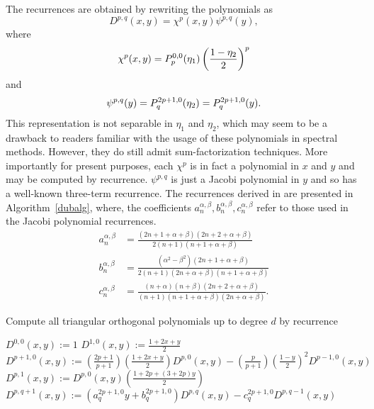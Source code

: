 The recurrences are obtained by rewriting the polynomials as
\[
D^{p,q}(x,y) = \chi^{p}(x,y) \psi^{p,q}(y),
\]
where\vspace*{10pt}
\[
 \chi^{p}(x,y) = P^{0,0}_p(\eta_1) \left( \frac{1-\eta_2}{2}
\right)^p\vspace*{1.5pt}
\]
and\vspace*{10pt}
\[
\psi^{p,q}(y)=P^{2p+1,0}_q(\eta_2) = P^{2p+1,0}_q(y).\vspace*{1.5pt}
\]
This representation is not separable in \( \eta_1 \) and \( \eta_2
\), which may seem to be a drawback to readers familiar with the
usage of these polynomials in spectral methods.  However, they do
still admit sum-factorization techniques.  More importantly for
present purposes, each \( \chi^p \) is in fact a polynomial in \(
x \) and \( y \) and may be computed by recurrence.  \( \psi^{p,q}
\) is just a Jacobi polynomial in \( y \) and so has a well-known
three-term recurrence.  The recurrences derived in \citet{Kirby}
are presented in Algorithm~\ref{dubalg}, where, the coefficients \(
a_n^{\alpha,\beta},b_n^{\alpha,\beta},c_n^{\alpha,\beta} \) refer to
those used in the Jacobi polynomial recurrences.
\begin{equation}
\label{eq:recurcoeff}
\begin{split}
a^{\alpha,\beta}_n
  & = \frac{(2n + 1 + \alpha + \beta)(2n + 2 + \alpha + \beta)}
             {2(n+1)(n+1+\alpha+\beta)}
\\
b^{\alpha,\beta}_n
  & = \frac{(\alpha^2 -\beta^2)(2n+1+\alpha+\beta)}
             {2(n+1)(2n+\alpha+\beta)(n+1+\alpha+\beta)}\\
c^{\alpha,\beta}_n & = \frac{(n+\alpha)(n+\beta)(2n+2+\alpha+\beta)}
             {(n+1)(n+1+\alpha+\beta)(2n+\alpha+\beta)}.
\end{split}
\end{equation}
\begin{algorithm}
\caption{Compute all triangular orthogonal polynomials up to degree
  $d$ by recurrence}
\label{dubalg}
\begin{algorithmic}[1]
\State $D^{0,0}(x,y) := 1$
\State $D^{1,0}(x,y) := \frac{1+2x+y}{2}$
\State $D^{p+1,0}(x,y) := \left( \frac{2p+1}{p+1} \right)
\left( \frac{1 + 2x + y}{2} \right) D^{p,0}(x,y)
- \left( \frac{p}{p+1} \right) \left( \frac{1-y}{2} \right)^2
D^{p-1,0}(x,y)$
\EndFor
{}
\State $D^{p,1}(x,y) := D^{p,0}(x,y) \left( \frac{1+2p+(3+2p) y}{2} \right)$
\EndFor
{}
\State $D^{p,q+1}(x,y) :=
\left( a_{q}^{2p+1,0} y + b_q^{2p+1,0} \right) D^{p,q}(x,y)
- c_q^{2p+1,0} D^{p,q-1}(x,y)$
\EndFor
\EndFor
\end{algorithmic}
\end{algorithm}

